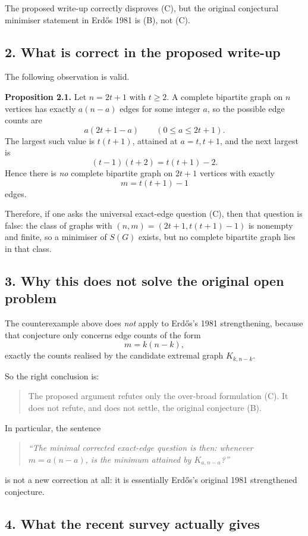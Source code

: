 The proposed write-up correctly disproves (C), but the original conjectural minimiser statement in Erd\H{o}s 1981 is (B), not (C).

\subsection*{2. What is correct in the proposed write-up}

The following observation is valid.

\textbf{Proposition 2.1.}
Let $n=2t+1$ with $t\ge 2$. A complete bipartite graph on $n$ vertices has exactly $a(n-a)$ edges for some integer $a$, so the possible edge counts are
\[
a(2t+1-a)\qquad(0\le a\le 2t+1).
\]
The largest such value is $t(t+1)$, attained at $a=t,t+1$, and the next largest is
\[
(t-1)(t+2)=t(t+1)-2.
\]
Hence there is \emph{no} complete bipartite graph on $2t+1$ vertices with exactly
\[
m=t(t+1)-1
\]
edges.

Therefore, if one asks the universal exact-edge question (C), then that question is false: the class of graphs with $(n,m)=(2t+1,t(t+1)-1)$ is nonempty and finite, so a minimiser of $S(G)$ exists, but no complete bipartite graph lies in that class.

\subsection*{3. Why this does not solve the original open problem}

The counterexample above does \emph{not} apply to Erd\H{o}s's 1981 strengthening, because that conjecture only concerns edge counts of the form
\[
m=k(n-k),
\]
exactly the counts realised by the candidate extremal graph $K_{k,n-k}$.

So the right conclusion is:
\begin{quote}
The proposed argument refutes only the over-broad formulation (C). It does not refute, and does not settle, the original conjecture (B).
\end{quote}

In particular, the sentence
\begin{quote}
\emph{``The minimal corrected exact-edge question is then: whenever $m=a(n-a)$, is the minimum attained by $K_{a,n-a}$?''}
\end{quote}
is not a new correction at all: it is essentially Erd\H{o}s's original 1981 strengthened conjecture.

\subsection*{4. What the recent survey actually gives}

